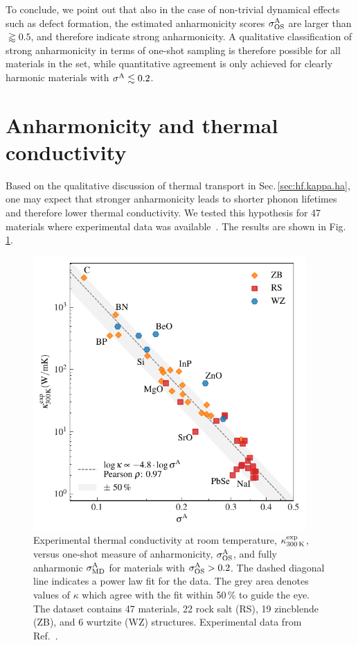 To conclude, we point out that also in the case of non-trivial dynamical effects such as defect formation, the estimated anharmonicity scores $\sigma^\mathrm{A}_\mathrm{OS}$ are larger than $\gtrapprox 0.5$, and therefore indicate strong anharmonicity. A qualitative classification of strong anharmonicity in terms of one-shot sampling is therefore possible for all materials in the set, while quantitative agreement is only achieved for clearly harmonic materials with $\sigma^\mathrm{A} \lesssim 0.2$.


\section{Anharmonicity and thermal conductivity}
\label{sec:kappa_vs_sigmaA}

Based on the qualitative discussion of thermal transport in Sec.\,\ref{sec:hf.kappa.ha}, one may expect that stronger anharmonicity leads to shorter phonon lifetimes and therefore lower thermal conductivity. We tested this hypothesis for 47 materials where experimental data was available~\cite{morelLi.2006,Chen.2019}. The results are shown in Fig.\,\ref{fig:anh.kappa}.
%
\begin{figure}
	\includegraphics[width=4.1in]{./data/plots/anharmonicity/9_kappa/sigma_vs_kappa.pdf}
	\caption{
		Experimental thermal conductivity at room temperature, $\kappa^{\rm exp}_{300\,{\rm K}}$, versus one-shot measure of anharmonicity, $\sigma^\mathrm{A}_\mathrm{OS}$, and fully anharmonic $\sigma^\mathrm{A}_\mathrm{MD}$ for materials with $\sigma^\mathrm{A}_\mathrm{OS} > 0.2$. 
		The dashed diagonal line indicates a power law fit for the data. The grey area denotes values of $\kappa$ which agree with the fit within 50\,\% to guide the eye. The dataset contains 47 materials, 22 rock salt (RS), 19 zincblende (ZB), and 6 wurtzite (WZ) structures. Experimental data from Ref.~\cite{morelLi.2006,Chen.2019}.
	}
	\label{fig:anh.kappa}
\end{figure}

